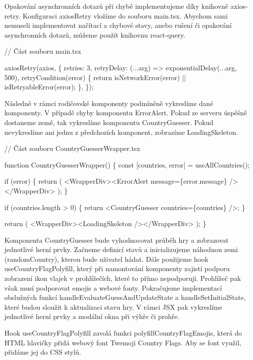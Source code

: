 Opakování asynchronních dotazů při chybě implementujeme díky knihovně axios-retry. Konfiguraci axiosRetry vložíme do souboru main.tsx. 
Abychom sami nemuseli implementovat načítací a chybové stavy, anebo rušení či opakování asynchronních dotazů, můžeme použít knihovnu react-query.

\begin{prog}
// Část souboru main.tsx

axiosRetry(axios, \{
  retries: 3,
  retryDelay: (...arg) => exponentialDelay(...arg, 500),
  retryCondition(error) \{
    return isNetworkError(error) || isRetryableError(error);
  \},
\});
\end{prog}

Následně v rámci rodičovské komponenty podmíněně vykreslíme dané komponenty. V případě chyby komponentu ErrorAlert. Pokud ze serveru úspěšně dostaneme země, tak vykreslíme komponentu CountryGuesser. 
Pokud nevykreslíme ani jednu z předchozích komponent, zobrazíme LoadingSkeleton.

\begin{prog}
// Část souboru CountryGuesserWrapper.tsx

function CountryGuesserWrapper() \{
  const [countries, error] = useAllCountries();

  if (error) \{
    return (
      <WrapperDiv><ErrorAlert message=\{error.message\} /></WrapperDiv>
    );
  \}

  if (countries.length > 0) \{
    return <CountryGuesser countries=\{countries\} />;
  \}

  return (
    <WrapperDiv><LoadingSkeleton /></WrapperDiv>
  );
\}
\end{prog}

Komponenta CountryGuesser bude vyhodnocovat průběh hry a zobrazovat jednotlivé herní prvky. Začneme definicí stavů a inicializujeme náhodnou zemi (randomCountry), kterou bude uživatel hádat. 
Dále použijeme hook useCountryFlagPolyfill, který při namontování komponenty zajistí podporu zobrazení ikon vlajek v prohlížečích, které to přímo nepodporují. 
Prohlížeč pak však musí podporovat emojis a webové fonty. Pokračujeme implementací obslužných funkcí handleEvaluateGuessAndUpdateState a handleSetInitialState, které budou sloužit k aktualizaci stavu hry. 
V rámci JSX pak vykreslíme jednotlivé herní prvky a modální okna při výhře či prohře.

Hook useCountryFlagPolyfill zavolá funkci polyfillCountryFlagEmojis, která do HTML hlavičky přidá webový font Twemoji Country Flags. Aby se font využil, přidáme jej do CSS stylů.

